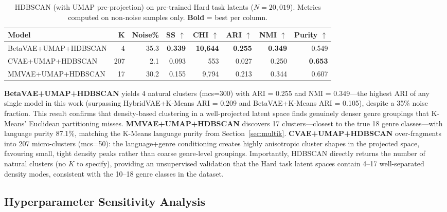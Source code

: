 \documentclass{article}
\begin{document}
\begin{table}[H]
\centering
\caption{HDBSCAN (with UMAP pre-projection) on pre-trained Hard task latents ($N\!=\!20{,}019$). Metrics computed on non-noise samples only. \textbf{Bold} = best per column.}
\label{tab:hdbscan}
\small
\begin{tabular}{lrrrrrrr}
\toprule
\textbf{Model} & \textbf{K} & \textbf{Noise\%} & \textbf{SS $\uparrow$} & \textbf{CHI $\uparrow$} & \textbf{ARI $\uparrow$} & \textbf{NMI $\uparrow$} & \textbf{Purity $\uparrow$} \\
\midrule
BetaVAE+UMAP+HDBSCAN & 4  & 35.3 & \textbf{0.339} & \textbf{10,644} & \textbf{0.255} & \textbf{0.349} & 0.549 \\
CVAE+UMAP+HDBSCAN    & 207 & 2.1  & 0.093          & 553             & 0.027          & 0.250          & \textbf{0.653} \\
MMVAE+UMAP+HDBSCAN   & 17 & 30.2 & 0.155          & 9,794           & 0.213          & 0.344          & 0.607 \\
\bottomrule
\end{tabular}
\end{table}

\textbf{BetaVAE+UMAP+HDBSCAN} yields 4 natural clusters (mcs=300) with ARI = 0.255 and NMI = 0.349---the highest ARI of any single model in this work (surpassing HybridVAE+K-Means ARI = 0.209 and BetaVAE+K-Means ARI = 0.105), despite a 35\% noise fraction. This result confirms that density-based clustering in a well-projected latent space finds genuinely denser genre groupings that K-Means' Euclidean partitioning misses. \textbf{MMVAE+UMAP+HDBSCAN} discovers 17 clusters---closest to the true 18 genre classes---with language purity 87.1\%, matching the K-Means language purity from Section~\ref{sec:multik}. \textbf{CVAE+UMAP+HDBSCAN} over-fragments into 207 micro-clusters (mcs=50): the language+genre conditioning creates highly anisotropic cluster shapes in the projected space, favouring small, tight density peaks rather than coarse genre-level groupings. Importantly, HDBSCAN directly returns the number of natural clusters (no $K$ to specify), providing an unsupervised validation that the Hard task latent spaces contain 4--17 well-separated density modes, consistent with the 10--18 genre classes in the dataset.

\subsection{Hyperparameter Sensitivity Analysis}
\label{sec:finetune}
\end{document}
